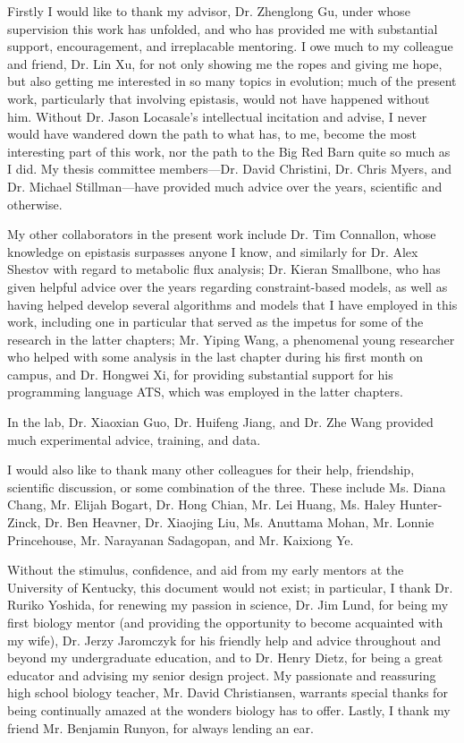 \documentclass[phd,tocprelim]{cornell}
\theoremstyle{break}
\begin{document}
\begin{acknowledgements}
Firstly I would like to thank my advisor, Dr. Zhenglong Gu, under
whose supervision this work has unfolded, and who has provided me with
substantial support, encouragement, and irreplacable mentoring. I owe
much to my colleague and friend, Dr. Lin Xu, for not only showing me
the ropes and giving me hope, but also getting me interested in so
many topics in evolution; much of the present work, particularly that
involving epistasis, would not have happened without him. Without
Dr. Jason Locasale's intellectual incitation and advise, I never would
have wandered down the path to what has, to me, become the most
interesting part of this work, nor the path to the Big Red Barn quite
so much as I did. My thesis committee members---Dr. David Christini,
Dr. Chris Myers, and Dr. Michael Stillman---have provided much advice
over the years, scientific and otherwise.

My other collaborators in the present work include Dr. Tim Connallon,
whose knowledge on epistasis surpasses anyone I know, and similarly
for Dr. Alex Shestov with regard to metabolic flux analysis;
Dr. Kieran Smallbone, who has given helpful advice over the years 
regarding constraint-based models, as well as having helped develop several  
algorithms and models that I have employed in this work, including one in 
particular that served as the impetus for some of the research in the latter 
chapters; Mr. Yiping Wang, a phenomenal young researcher who helped
with some analysis in the last chapter during his first month on
campus, and Dr. Hongwei Xi, for providing substantial support for his
programming language ATS, which was employed in the latter chapters.

In the lab, Dr. Xiaoxian Guo, Dr. Huifeng Jiang, and Dr. Zhe Wang
provided much experimental advice, training, and data.

I would also like to thank many other colleagues for their help,
friendship, scientific discussion, or some combination of
the three. These include Ms. Diana Chang, Mr. Elijah Bogart, 
Dr. Hong Chian, Mr. Lei Huang,
Ms. Haley Hunter-Zinck, Dr. Ben Heavner, Dr. Xiaojing Liu, Ms. Anuttama Mohan,
Mr. Lonnie Princehouse, Mr. Narayanan Sadagopan, and Mr. Kaixiong Ye.

Without the stimulus, confidence, and aid from my early mentors at the
University of Kentucky, this document would not exist; in particular,
I thank Dr. Ruriko Yoshida, for renewing my passion in science,
Dr. Jim Lund, for being my first biology mentor (and providing the
opportunity to become acquainted with my wife), Dr. Jerzy Jaromczyk
for his friendly help and advice throughout and beyond my
undergraduate education, and to Dr. Henry Dietz, for being a great
educator and advising my senior design project.  My passionate and
reassuring high school biology teacher, Mr. David Christiansen,
warrants special thanks for being continually amazed at the wonders
biology has to offer. Lastly, I thank my friend Mr. Benjamin Runyon,
for always lending an ear.
\end{acknowledgements}
\end{document}

